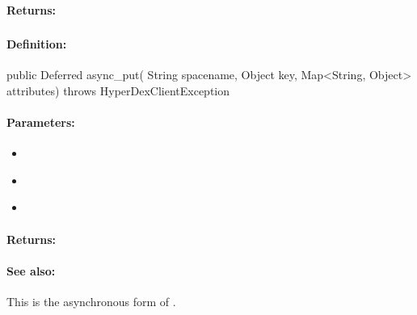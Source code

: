 \paragraph{Returns:}


\pagebreak
\subsubsection{}
\label{api:java:async_put}


\paragraph{Definition:}
\begin{javacode}
public Deferred async_put(
        String spacename,
        Object key,
        Map<String, Object> attributes) throws HyperDexClientException
\end{javacode}

\paragraph{Parameters:}
\begin{itemize}[noitemsep]
\item {}\\

\item {}\\

\item {}\\

\end{itemize}

\paragraph{Returns:}


\paragraph{See also:}  This is the asynchronous form of .

\pagebreak
